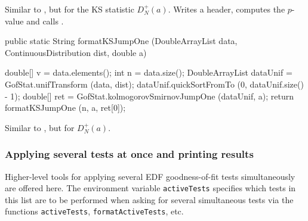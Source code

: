 \begin{tabb}  Similar to ,
   but for the KS statistic $D_N^+(a)$.
   Writes a header,
  computes the $p$-value and calls .
\end{tabb}
\begin{htmlonly}
\end{htmlonly}
\begin{code}

   public static String formatKSJumpOne (DoubleArrayList data,
                                         ContinuousDistribution dist,
                                         double a)\begin{hide} {

      double[] v = data.elements();
      int n = data.size();
      DoubleArrayList dataUnif = GofStat.unifTransform (data, dist);
      dataUnif.quickSortFromTo (0, dataUnif.size() - 1);
      double[] ret =  GofStat.kolmogorovSmirnovJumpOne (dataUnif, a);
      return formatKSJumpOne (n, a, ret[0]);
   }\end{hide}
\end{code}
\begin{tabb} Similar to ,
  but for $D_N^+(a)$.
\end{tabb}
\begin{htmlonly}
\end{htmlonly}

\subsubsection* {Applying several tests at once and printing results}

Higher-level tools for applying several EDF goodness-of-fit tests
simultaneously are offered here.
The environment variable \texttt{activeTests} specifies which
tests in this list are to be performed when asking for several
simultaneous tests via the functions \texttt{activeTests},
\texttt{formatActiveTests}, etc.

